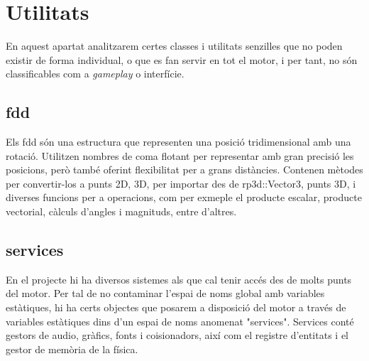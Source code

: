 \section{Utilitats}
En aquest apartat analitzarem certes classes i utilitats senzilles que no poden existir de forma individual, o que es fan servir en tot el motor, i per tant, no són classificables com a \textit{gameplay} o interfície.

\subsection{fdd}
Els fdd són una estructura que representen una posició tridimensional amb una rotació. Utilitzen nombres de coma flotant per representar amb gran precisió les posicions, però també oferint flexibilitat per a grans distàncies.
Contenen mètodes per convertir-los a punts 2D, 3D, per importar des de rp3d::Vector3, punts 3D, i diverses funcions per a operacions, com per exmeple el producte escalar, producte vectorial, càlculs d'angles i magnituds, entre d'altres.
\subsection{services}
En el projecte hi ha diversos sistemes als que cal tenir accés des de molts punts del motor. Per tal de no contaminar l'espai de noms global amb variables estàtiques, hi ha certs objectes que posarem a disposició del motor a través de variables estàtiques dins d'un espai de noms anomenat "services".
Services conté gestors de audio, gràfics, fonts i co\lgem isionadors, així com el registre d'entitats i el gestor de memòria de la física.
